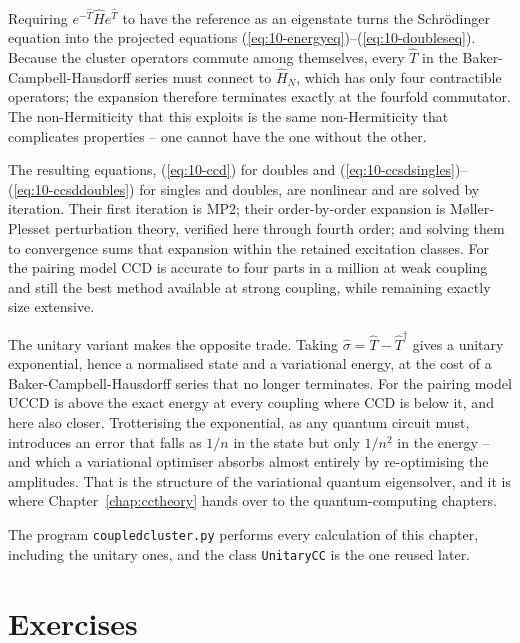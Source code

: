 Requiring $e^{-\hat{T}}\hat{H}e^{\hat{T}}$ to have the reference as an
eigenstate turns the Schr\"odinger equation into the projected equations
(\ref{eq:10-energyeq})--(\ref{eq:10-doubleseq}).  Because the cluster
operators commute among themselves, every $\hat{T}$ in the
Baker-Campbell-Hausdorff series must connect to $\hat{H}_N$, which has only
four contractible operators; the expansion therefore terminates exactly at
the fourfold commutator.  The non-Hermiticity that this exploits is the same
non-Hermiticity that complicates properties -- one cannot have the one
without the other.

The resulting equations, (\ref{eq:10-ccd}) for doubles and
(\ref{eq:10-ccsdsingles})--(\ref{eq:10-ccsddoubles}) for singles and doubles,
are nonlinear and are solved by iteration.  Their first iteration is MP2;
their order-by-order expansion is M\o{}ller-Plesset perturbation theory,
verified here through fourth order; and solving them to convergence sums that
expansion within the retained excitation classes.  For the pairing model CCD
is accurate to four parts in a million at weak coupling and still the best
method available at strong coupling, while remaining exactly size extensive.

The unitary variant makes the opposite trade.  Taking
$\hat{\sigma}=\hat{T}-\hat{T}^{\dagger}$ gives a unitary exponential, hence a
normalised state and a variational energy, at the cost of a
Baker-Campbell-Hausdorff series that no longer terminates.  For the pairing
model UCCD is above the exact energy at every coupling where CCD is below it,
and here also closer.  Trotterising the exponential, as any quantum circuit
must, introduces an error that falls as $1/n$ in the state but only $1/n^2$ in
the energy -- and which a variational optimiser absorbs almost entirely by
re-optimising the amplitudes.  That is the structure of the variational
quantum eigensolver, and it is where Chapter~\ref{chap:cctheory} hands over to
the quantum-computing chapters.

The program \texttt{coupledcluster.py} performs every calculation of this
chapter, including the unitary ones, and the class \texttt{UnitaryCC} is the
one reused later.

\section{Exercises}
\label{sec:ch10exercises}

